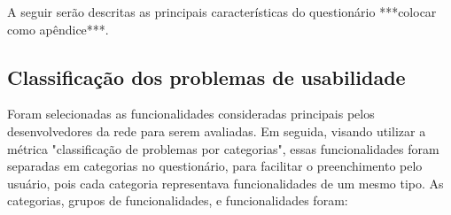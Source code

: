 	
	A seguir serão descritas as principais características do questionário ***colocar como apêndice***.
	

\subsection{Classificação dos problemas de usabilidade}
\label{sec:classificacao}
	
	Foram selecionadas as funcionalidades consideradas principais pelos desenvolvedores da rede para serem avaliadas. Em seguida, visando utilizar a métrica  "classificação de problemas por categorias", essas funcionalidades foram separadas em categorias no questionário, para facilitar o preenchimento pelo usuário, pois cada categoria representava funcionalidades de um mesmo tipo. As categorias, grupos de funcionalidades, e funcionalidades foram: 
